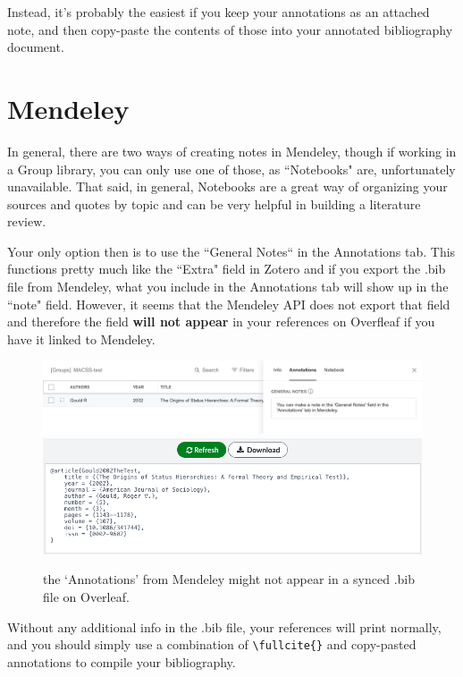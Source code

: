 \documentclass{article}
\begin{document}
Instead, it's probably the easiest if you keep your annotations as an attached note, and then copy-paste the contents of those into your annotated bibliography document. 

\FloatBarrier
\section*{Mendeley}
In general, there are two ways of creating notes in Mendeley, though if working in a Group library, you can only use one of those, as ``Notebooks" are, unfortunately unavailable. That said, in general, Notebooks are a great way of organizing your sources and quotes by topic and can be very helpful in building a literature review.

Your only option then is to use the ``General Notes`` in the Annotations tab. This functions pretty much like the ``Extra" field in Zotero and if you export the .bib file from Mendeley, what you include in the Annotations tab will show up in the ``note"  field. However, it seems that the Mendeley API does not export that field and therefore the field \textbf{will not appear} in your references on Overfleaf if you have it linked to Mendeley.

\begin{figure}[!ht]
\centering
\includegraphics[width=\textwidth]{screenshots/Mendeley1a.png}
\includegraphics[width=\textwidth]{screenshots/Mendeley2.png}
\caption{the `Annotations' from Mendeley might not appear in a synced .bib file on Overleaf.}
\end{figure}


Without any additional info in the .bib file, your references will print normally, and you should simply use a combination of \verb|\fullcite{}| and copy-pasted annotations to compile your bibliography.
\end{document}
